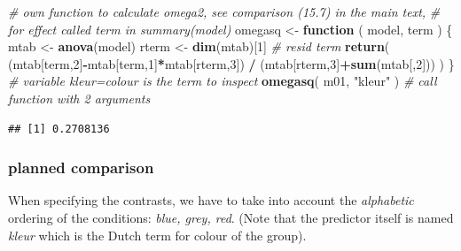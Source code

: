 \documentclass[
]{book}
\newenvironment{Shaded}{\begin{snugshade}}{\end{snugshade}}
\newcommand{\CommentTok}[1]{\textcolor[rgb]{0.56,0.35,0.01}{\textit{#1}}}
\newcommand{\ControlFlowTok}[1]{\textcolor[rgb]{0.13,0.29,0.53}{\textbf{#1}}}
\newcommand{\DecValTok}[1]{\textcolor[rgb]{0.00,0.00,0.81}{#1}}
\newcommand{\KeywordTok}[1]{\textcolor[rgb]{0.13,0.29,0.53}{\textbf{#1}}}
\newcommand{\NormalTok}[1]{#1}
\newcommand{\OperatorTok}[1]{\textcolor[rgb]{0.81,0.36,0.00}{\textbf{#1}}}
\newcommand{\StringTok}[1]{\textcolor[rgb]{0.31,0.60,0.02}{#1}}
\begin{document}
\begin{Shaded}
\begin{Highlighting}[]
\CommentTok{\# own function to calculate omega2, see comparison (15.7) in the main text,}
\CommentTok{\# for effect called \textasciigrave{}term\textasciigrave{} in summary(\textasciigrave{}model\textasciigrave{})}
\NormalTok{omegasq \textless{}{-}}\StringTok{ }\ControlFlowTok{function}\NormalTok{ ( model, term ) \{   }
\NormalTok{     mtab \textless{}{-}}\StringTok{ }\KeywordTok{anova}\NormalTok{(model)}
\NormalTok{     rterm \textless{}{-}}\StringTok{ }\KeywordTok{dim}\NormalTok{(mtab)[}\DecValTok{1}\NormalTok{] }\CommentTok{\# resid term}
     \KeywordTok{return}\NormalTok{( (mtab[term,}\DecValTok{2}\NormalTok{]}\OperatorTok{{-}}\NormalTok{mtab[term,}\DecValTok{1}\NormalTok{]}\OperatorTok{*}\NormalTok{mtab[rterm,}\DecValTok{3}\NormalTok{]) }\OperatorTok{/}\StringTok{ }
\StringTok{             }\NormalTok{(mtab[rterm,}\DecValTok{3}\NormalTok{]}\OperatorTok{+}\KeywordTok{sum}\NormalTok{(mtab[,}\DecValTok{2}\NormalTok{])) )}
\NormalTok{\}}
\CommentTok{\# variable kleur=colour is the term to inspect}
\KeywordTok{omegasq}\NormalTok{( m01, }\StringTok{"kleur"}\NormalTok{ ) }\CommentTok{\# call function with 2 arguments}
\end{Highlighting}
\end{Shaded}

\begin{verbatim}
## [1] 0.2708136
\end{verbatim}

\hypertarget{planned-comparison-2}{%
\subsubsection{planned comparison}\label{planned-comparison-2}}

When specifying the contrasts, we have to take into account the
\emph{alphabetic} ordering of the conditions: \emph{blue, grey, red}.
(Note that the predictor itself is named \emph{kleur} which is the Dutch term for colour of the group).
\end{document}

